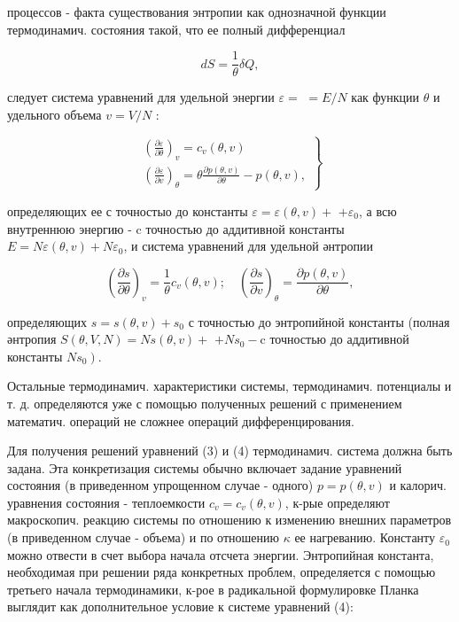 \documentclass[10pt]{article}
\begin{document}
процессов - факта существования энтропии как однозначной функции термодинамич. состояния такой, что ее полный дифференциал



\[

d S=\frac{1}{\theta} \delta Q,

\]



следует система уравнений для удельной энергии $\varepsilon=$ $=E / N$ как функции $\theta$ и удельного объема $v=V / N$ :



\[

\left.\begin{array}{l}

\left(\frac{\partial \varepsilon}{\partial \theta}\right)_{v}=c_{v}(\theta, v) \\

\left(\frac{\partial \varepsilon}{\partial v}\right)_{\theta}=\theta \frac{\partial p(\theta, v)}{\partial \theta}-p(\theta, v),

\end{array}\right\}

\]



определяющих ее с точностыо до константы $\varepsilon=\varepsilon(\theta, v)+$ $+\varepsilon_{0}$, а всю внутреннюю энергию - $\mathrm{c}$ точностью до аддитивной константы $E=N \varepsilon(\theta, v)+N \varepsilon_{0}$, и система уравнений для удельной әнтропии



\[

\left(\frac{\partial s}{\partial \theta}\right)_{v}=\frac{1}{\theta} c_{v}(\theta, v) ; \quad\left(\frac{\partial s}{\partial v}\right)_{\theta}=\frac{\partial p(\theta, v)}{\partial \theta},

\]



определяющих $s=s(\theta, v)+s_{0}$ с точностью до энтропийной константы (полная әнтропия $S(\theta, V, N)=N s(\theta, v)+$ $+N s_{0}-\mathrm{c}$ точностью до аддитивной константы $\left.N s_{0}\right)$.



Остальные термодинамич. характеристики системы, термодинамич. потенциалы и т. д. определяются уже с помощью полученных решений с применением математич. операций не сложнее операций дифференцирования.



Для получения решений уравнений (3) и (4) термодинамич. система должна быть задана. Эта конкретизация системы обычно включает задание уравнений состояния (в приведенном упрощенном случае - одного) $p=p(\theta, v)$ и калорич. уравнения состояния - теплоемкости $c_{v}=c_{v}(\theta, v)$, к-рые определяют макроскопич. реакцию системы по отношению к изменению внешних параметров (в приведенном случае - объема) и по отношению $\kappa$ ее нагреванию. Константу $\varepsilon_{0}$ можно отвести в счет выбора начала отсчета энергии. Энтропийная константа, необходимая при решении ряда конкретных проблем, определяется с помощью третьего начала термодинамики, к-рое в радикальной формулировке Планка выглядит как дополнительное условие к системе уравнений (4):
\end{document}
